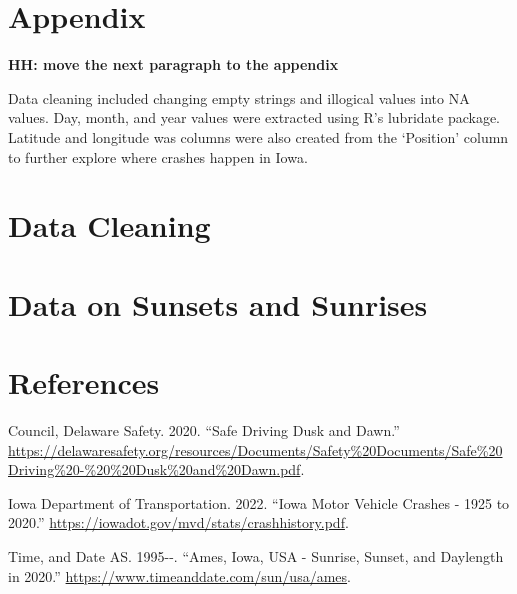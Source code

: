 \documentclass[conference,final,]{IEEEtran}
\newlength{\cslhangindent}
\newlength{\cslentryspacingunit} %
\newenvironment{CSLReferences}[2] %
 {%
  \setlength{\parindent}{0pt}
  \ifodd #1
  \let\oldpar\par
  \def\par{\hangindent=\cslhangindent\oldpar}
  \fi
  \setlength{\parskip}{#2\cslentryspacingunit}
 }%
 {}
\begin{document}
\clearpage

\hypertarget{appendix}{%
\section*{Appendix}\label{appendix}}

\textbf{HH: move the next paragraph to the appendix}

Data cleaning included changing empty strings and illogical values into NA values. Day, month, and year values were extracted using R's lubridate package. Latitude and longitude was columns were also created from the `Position' column to further explore where crashes happen in Iowa.

\hypertarget{data-cleaning}{%
\section{Data Cleaning}\label{data-cleaning}}

\hypertarget{data-on-sunsets-and-sunrises}{%
\section{Data on Sunsets and Sunrises}\label{data-on-sunsets-and-sunrises}}

\clearpage

\hypertarget{references}{%
\section*{References}\label{references}}

\hypertarget{refs}{}
\begin{CSLReferences}{1}{0}
\leavevmode{}%
Council, Delaware Safety. 2020. {``Safe Driving Dusk and Dawn.''} \url{https://delawaresafety.org/resources/Documents/Safety\%20Documents/Safe\%20Driving\%20-\%20\%20Dusk\%20and\%20Dawn.pdf}.

\leavevmode{}%
Iowa Department of Transportation. 2022. {``Iowa Motor Vehicle Crashes - 1925 to 2020.''} \url{https://iowadot.gov/mvd/stats/crashhistory.pdf}.

\leavevmode{}%
Time, and Date AS. 1995-\/-. {``Ames, Iowa, USA - Sunrise, Sunset, and Daylength in 2020.''} \url{https://www.timeanddate.com/sun/usa/ames}.

\end{CSLReferences}
\end{document}
